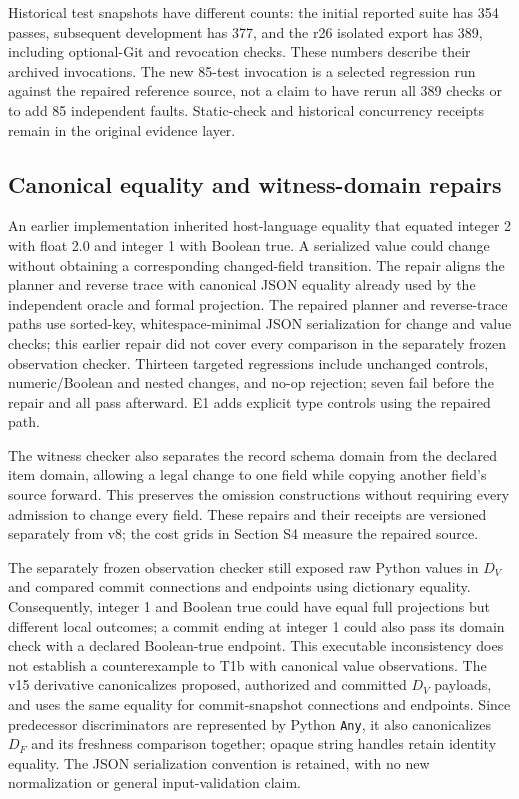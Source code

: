 \documentclass[11pt,a4paper]{article}
\newcommand{\code}[1]{\nolinkurl{#1}}
\begin{document}
Historical test snapshots have different counts: the initial reported suite has 354 passes, subsequent development has 377, and the r26 isolated export has 389, including optional-Git and revocation checks. These numbers describe their archived invocations. The new 85-test invocation is a selected regression run against the repaired reference source, not a claim to have rerun all 389 checks or to add 85 independent faults. Static-check and historical concurrency receipts remain in the original evidence layer.

\subsection{Canonical equality and witness-domain repairs}

An earlier implementation inherited host-language equality that equated integer 2 with float 2.0 and integer 1 with Boolean true. A serialized value could change without obtaining a corresponding changed-field transition. The repair aligns the planner and reverse trace with canonical JSON equality already used by the independent oracle and formal projection. The repaired planner and reverse-trace paths use sorted-key, whitespace-minimal JSON serialization for change and value checks; this earlier repair did not cover every comparison in the separately frozen observation checker. Thirteen targeted regressions include unchanged controls, numeric/Boolean and nested changes, and no-op rejection; seven fail before the repair and all pass afterward. E1 adds explicit type controls using the repaired path.

The witness checker also separates the record schema domain from the declared item domain, allowing a legal change to one field while copying another field's source forward. This preserves the omission constructions without requiring every admission to change every field. These repairs and their receipts are versioned separately from v8; the cost grids in Section S4 measure the repaired source.

The separately frozen observation checker still exposed raw Python values in $D_V$ and compared commit connections and endpoints using dictionary equality. Consequently, integer 1 and Boolean true could have equal full projections but different local outcomes; a commit ending at integer 1 could also pass its domain check with a declared Boolean-true endpoint. This executable inconsistency does not establish a counterexample to T1b with canonical value observations. The v15 derivative canonicalizes proposed, authorized and committed $D_V$ payloads, and uses the same equality for commit-snapshot connections and endpoints. Since predecessor discriminators are represented by Python \code{Any}, it also canonicalizes $D_F$ and its freshness comparison together; opaque string handles retain identity equality. The JSON serialization convention is retained, with no new normalization or general input-validation claim.
\end{document}
